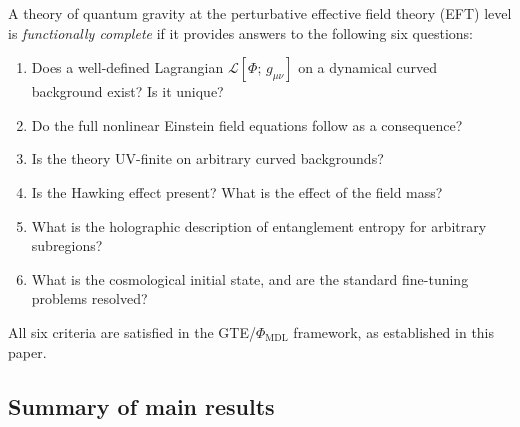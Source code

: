 \documentclass[11pt]{article}
\theoremstyle{remark}
\newcommand{\PHIMDL}{\Phi_{\mathrm{MDL}}}
\newcommand{\LL}{\mathcal{L}}
\begin{document}
A theory of quantum gravity at the perturbative effective field theory (EFT) level is \emph{functionally
complete} if it provides answers to the following six questions:
\begin{enumerate}[label=(\roman*)]
\item Does a well-defined Lagrangian $\LL[\Phi;\,g_{\mu\nu}]$ on a dynamical curved
  background exist?  Is it unique?
\item Do the full nonlinear Einstein field equations follow as a consequence?
\item Is the theory UV-finite on arbitrary curved backgrounds?
\item Is the Hawking effect present?  What is the effect of the field mass?
\item What is the holographic description of entanglement entropy for arbitrary
  subregions?
\item What is the cosmological initial state, and are the standard fine-tuning
  problems resolved?
\end{enumerate}
All six criteria are satisfied in the GTE/$\PHIMDL$ framework, as established in this
paper.

\subsection*{Summary of main results}
\end{document}
